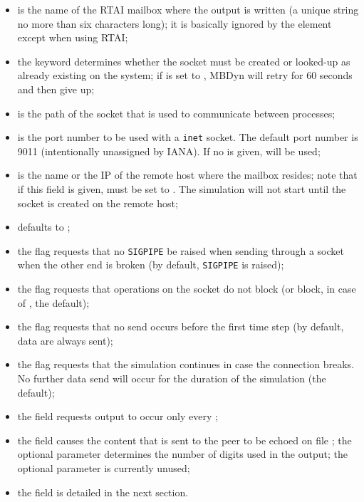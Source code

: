 \begin{itemize}
\item {} is the name of the RTAI mailbox where 
the output is written  (a unique string no more than six characters long);
it is basically ignored by the  element
except when using RTAI;

\item the  keyword determines whether the socket
must be created or looked-up as already existing on the system;
if  is set to , MBDyn will retry for 60 seconds
and then give up;

\item {} is the path of the  socket 
that is used to communicate between processes;

\item {} is the port number to be used with a \texttt{inet} socket.
The default port number is 9011 (intentionally unassigned by IANA).
If no  is given,  will be used;

\item {} is the name or the IP of the remote host where
the mailbox resides; note that if this field is given,  must
be set to .
The simulation will not start until the socket is created on the remote host;

\item {} defaults to ;

\item the flag  requests that no \texttt{SIGPIPE} be raised
when sending through a socket when the other end is broken
(by default, \texttt{SIGPIPE} is raised);

\item the flag  requests that operations on the socket
do not block (or block, in case of , the default);

\item the flag  requests that no send occurs before
the first time step (by default, data are always sent);

\item the flag  requests that the simulation
continues in case the connection breaks.
No further data send will occur for the duration of the simulation
(the default);

\item the field  requests output to occur
only every ;

\item the field  causes the content that is sent to the peer
to be echoed on file ; the optional parameter 
determines the number of digits used in the output; the optional parameter
 is currently unused;

\item the field  is detailed in the next section.
\end{itemize}
